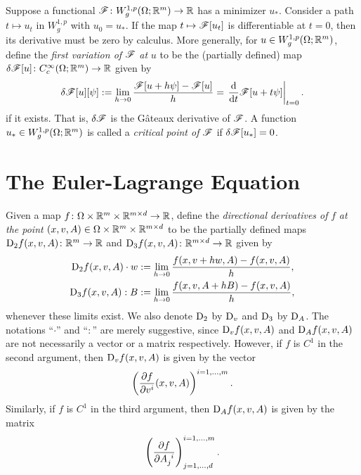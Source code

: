 
Suppose a functional $\mathscr{F} \colon W^{1,p}_g(\Omega;\mathbb{R}^m) \to \mathbb{R}$ has a minimizer $u_*$. Consider a path $t \mapsto u_t$ in $W_g^{1,p}$ with $u_0 = u_*$. If the map $t \mapsto \mathscr{F}[u_t]$ is differentiable at $t=0$, then its derivative must be zero by calculus. More generally, for $u \in W^{1,p}_g(\Omega;\mathbb{R}^m)$, define the \textit{first variation of} $\mathscr{F}$ \textit{at} $u$ to be the (partially defined) map $\delta\mathscr{F}[u] \colon C_c^\infty(\Omega;\mathbb{R}^m) \to \mathbb{R}$ given by 
\begin{equation}
    \delta\mathscr{F}[u][\psi] := \lim_{h \to 0} \frac{\mathscr{F}[u+h\psi] - \mathscr{F}[u]}{h} 
                          = \left. \frac{\mathrm{d}}{\mathrm{d}t} \mathscr{F}[u+t\psi] \right\vert_{t=0}.
\end{equation}
if it exists. That is, $\delta\mathscr{F}$ is the G\^ateaux derivative of $\mathscr{F}$. A function $u_* \in W^{1,p}_g(\Omega;\mathbb{R}^m)$ is called a \textit{critical point of} $\mathscr{F}$ if $\delta\mathscr{F}[u_*] = 0$.

\section{The Euler-Lagrange Equation}
Given a map $f \colon \Omega \times \mathbb{R}^m \times \mathbb{R}^{m \times d} \to \mathbb{R}$, define the \textit{directional derivatives of} $f$ \textit{at the point} $(x,v,A) \in \Omega \times \mathbb{R}^m \times \mathbb{R}^{m \times d}$ to be the partially defined maps $\mathrm{D}_2f(x,v,A) \colon \mathbb{R}^m \to \mathbb{R}$ and $\mathrm{D}_3f(x,v,A) \colon \mathbb{R}^{m \times d} \to \mathbb{R}$ given by 
\begin{align}
    \mathrm{D}_2f(x,v,A) \cdot w &:= \lim_{h \to 0} \frac{f(x,v+hw,A) - f(x,v,A)}{h}, \\
    \mathrm{D}_3f(x,v,A) : B     &:= \lim_{h \to 0} \frac{f(x,v,A+hB) - f(x,v,A)}{h},
\end{align}
whenever these limits exist. We also denote $\mathrm{D}_2$ by $\mathrm{D}_v$ and $\mathrm{D}_3$ by $\mathrm{D}_A$. The notations ``$\cdot$'' and ``$:$'' are merely suggestive, since $\mathrm{D}_v f(x,v,A)$ and $\mathrm{D}_A f(x,v,A)$ are not necessarily a vector or a matrix respectively. However, if $f$ is $C^1$ in the second argument, then $\mathrm{D}_v f(x,v,A)$ is given by the vector 
\begin{equation}
    \left( { \frac{\partial f}{\partial v^i}(x,v,A) } \right)^{i=1,\dots,m}.
\end{equation}
Similarly, if $f$ is $C^1$ in the third argument, then $\mathrm{D}_A f(x,v,A)$ is given by the matrix 
\begin{equation}
    \parens{ \frac{\partial f}{\partial \tensor{A}{_j^i}} }_{j=1,\dots,d}^{i=1,\dots,m}.
\end{equation}

